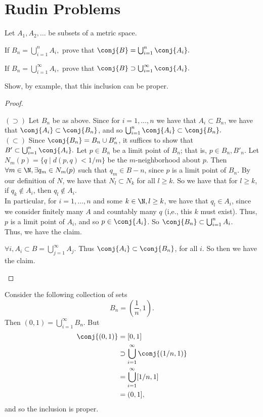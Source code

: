 \documentclass{assignment}
\begin{document}

\section*{Rudin Problems}
\begin{question}[2.7*]
  Let $A_1, A_2, \ldots$ be subsets of a metric space.
\begin{qparts}
\item If $B_n = \bigcup_{i=1}^n A_i,$ prove that $\conj{B} = \bigcup_{i=1}^n \conj{A_i}.$
\item If $B_n = \bigcup_{i=1}^\infty A_i,$ prove that $\conj{B} \supset \bigcup_{i=1}^\infty \conj{A_i}.$
\end{qparts}
Show, by example, that this inclusion can be proper.
\end{question}
\begin{proof}\leavevmode
  \begin{qparts}
  \item $(\supset)$ Let $B_n$ be as above. Since for $i=1,\ldots, n$ we have that $A_i\subset B_n$,
    we have that $\conj{A_i}\subset\conj{B_n}$, and so $\bigcup_{i=1}^n\conj{A_i} \subset \conj{B_n}.$ \\

    $(\subset)$ Since $\conj{B_n} = B_n \cup B'_n$, it suffices to show that $B' \subset 
    \bigcup_{i=1}^n \conj{A_i}.$ Let $p\in B_n$ be a limit point of $B_n$; that is, $p\in B_n, B'_n$. 
    Let $N_m(p) = \{q\mid d(p,q) < 1/m\}$ be the $m$-neighborhood about $p$.
    Then $\forall m\in\N, \exists q_m \in N_m(p)$ such that $q_m\in B-n$, since $p$ is a limit point
    of $B_n$. By our definition of $N$, we have that $N_l \subset N_k$ for all $l\geq k$. So we have 
    that for $l \geq k$, if $q_k\notin A_i$, then $q_l\notin A_i$. \\

    In particular, for $i = 1,\ldots, n$ and some $k\in\N, l\geq k$, we have that $q_l\in A_i$, since
    we consider finitely many $A$ and countably many $q$ (i,e., this $k$ must exist). Thus, $p$ is a 
    limit point of $A_i$, and so $p\in\conj{A_i}$. So $\conj{B_n}\subset\bigcup_{i=1}^n A_i$.\\

    Thus, we have the claim.

  \item $\forall i, A_i \subset B = \bigcup_{j=1}^\infty A_j$. Thus $\conj{A_i} \subset \conj{B_n}$, 
    for all $i$. So then we have the claim.
    \end{qparts}
\end{proof}
Consider the following collection of sets $$B_n = \left(\frac{1}{n}, 1\right).$$ Then $(0,1) = \bigcup
_{i=1}^\infty B_n.$ But 
\begin{align*}
  \conj{(0,1)} &= [0,1] \\
               &\supset \bigcup_{i=1}^\infty \conj{(1/n, 1)} \\
               &= \bigcup_{i=1}^\infty [1/n, 1] \\
               &= (0,1],
\end{align*}
and so the inclusion is proper.
\end{document}
